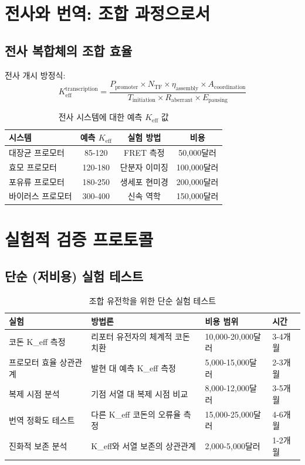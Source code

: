 \documentclass[11pt,a4paper]{article}
\begin{document}
	\section{전사와 번역: 조합 과정으로서}
	
	\subsection{전사 복합체의 조합 효율}
	
	전사 개시 방정식:
	\[
	K_{\text{eff}}^{\text{transcription}} = \frac{P_{\text{promoter}} \times N_{\text{TF}} \times \eta_{\text{assembly}} \times A_{\text{coordination}}}{T_{\text{initiation}} \times R_{\text{aberrant}} \times E_{\text{pausing}}}
	\]
	
	\begin{table}[H]
		\centering
		\caption{전사 시스템에 대한 예측 $K_{\text{eff}}$ 값}
		\begin{tabular}{lccc}
			\toprule
			\textbf{시스템} & \textbf{예측 $K_{\text{eff}}$} & \textbf{실험 방법} & \textbf{비용} \\
			\midrule
			대장균 프로모터 & 85-120 & FRET 측정 & 50,000달러 \\
			효모 프로모터 & 120-180 & 단분자 이미징 & 100,000달러 \\
			포유류 프로모터 & 180-250 & 생세포 현미경 & 200,000달러 \\
			바이러스 프로모터 & 300-400 & 신속 역학 & 150,000달러 \\
			\bottomrule
		\end{tabular}
	\end{table}
	
	\section{실험적 검증 프로토콜}
	
	\subsection{단순 (저비용) 실험 테스트}
	
	\begin{table}[H]
		\centering
		\caption{조합 유전학을 위한 단순 실험 테스트}
		\begin{tabular}{p{4cm}p{5cm}p{3cm}p{2cm}}
			\toprule
			\textbf{실험} & \textbf{방법론} & \textbf{비용 범위} & \textbf{시간} \\
			\midrule
			코돈 K\_eff 측정 & 리포터 유전자의 체계적 코돈 치환 & 10,000-20,000달러 & 3-4개월 \\
			프로모터 효율 상관관계 & 발현 대 예측 K\_eff 측정 & 5,000-15,000달러 & 2-3개월 \\
			복제 시점 분석 & 기점 서열 대 복제 시점 비교 & 8,000-12,000달러 & 3-5개월 \\
			번역 정확도 테스트 & 다른 K\_eff 코돈의 오류율 측정 & 15,000-25,000달러 & 4-6개월 \\
			진화적 보존 분석 & K\_eff와 서열 보존의 상관관계 & 2,000-5,000달러 & 1-2개월 \\
			\bottomrule
		\end{tabular}
	\end{table}
	
\end{document}
